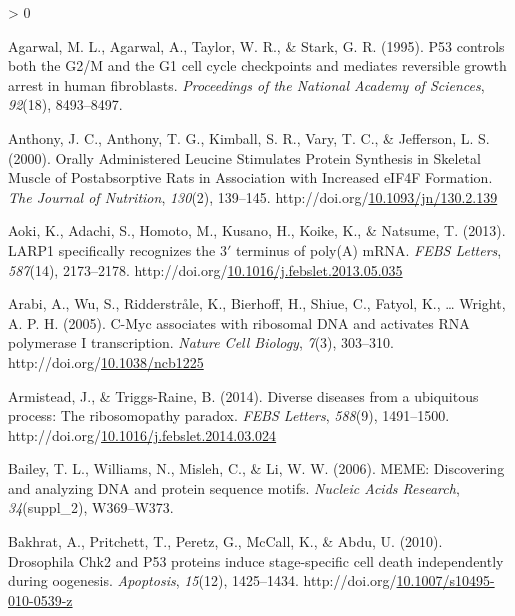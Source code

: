 \documentclass[12pt,oneside]{reedthesis}
\newlength{\cslhangindent}
\newenvironment{CSLReferences}[2] %
 {%
  \setlength{\parindent}{0pt}
  \ifodd #1 \everypar{\setlength{\hangindent}{\cslhangindent}}\ignorespaces\fi
  \ifnum #2 > 0
  \setlength{\parskip}{#2\baselineskip}
  \fi
 }%
 {}
\begin{document}
\hypertarget{refs}{}
\begin{CSLReferences}{1}{0}
\leavevmode\hypertarget{ref-Agarwal1995a}{}%
Agarwal, M. L., Agarwal, A., Taylor, W. R., \& Stark, G. R. (1995). P53 controls both the {G2}/{M} and the {G1} cell cycle checkpoints and mediates reversible growth arrest in human fibroblasts. \emph{Proceedings of the National Academy of Sciences}, \emph{92}(18), 8493--8497.

\leavevmode\hypertarget{ref-anthonyOrallyAdministeredLeucine2000}{}%
Anthony, J. C., Anthony, T. G., Kimball, S. R., Vary, T. C., \& Jefferson, L. S. (2000). Orally {Administered Leucine Stimulates Protein Synthesis} in {Skeletal Muscle} of {Postabsorptive Rats} in {Association} with {Increased eIF4F Formation}. \emph{The Journal of Nutrition}, \emph{130}(2), 139--145. http://doi.org/\href{https://doi.org/10.1093/jn/130.2.139}{10.1093/jn/130.2.139}

\leavevmode\hypertarget{ref-aokiLARP1SpecificallyRecognizes2013}{}%
Aoki, K., Adachi, S., Homoto, M., Kusano, H., Koike, K., \& Natsume, T. (2013). {LARP1} specifically recognizes the 3{\({'}\)} terminus of poly({A}) {mRNA}. \emph{FEBS Letters}, \emph{587}(14), 2173--2178. http://doi.org/\href{https://doi.org/10.1016/j.febslet.2013.05.035}{10.1016/j.febslet.2013.05.035}

\leavevmode\hypertarget{ref-arabiCMycAssociatesRibosomal2005}{}%
Arabi, A., Wu, S., Ridderstråle, K., Bierhoff, H., Shiue, C., Fatyol, K., \ldots{} Wright, A. P. H. (2005). C-{Myc} associates with ribosomal {DNA} and activates {RNA} polymerase {I} transcription. \emph{Nature Cell Biology}, \emph{7}(3), 303--310. http://doi.org/\href{https://doi.org/10.1038/ncb1225}{10.1038/ncb1225}

\leavevmode\hypertarget{ref-Armistead2014a}{}%
Armistead, J., \& Triggs-Raine, B. (2014). Diverse diseases from a ubiquitous process: {The} ribosomopathy paradox. \emph{FEBS Letters}, \emph{588}(9), 1491--1500. http://doi.org/\href{https://doi.org/10.1016/j.febslet.2014.03.024}{10.1016/j.febslet.2014.03.024}

\leavevmode\hypertarget{ref-Bailey2006a}{}%
Bailey, T. L., Williams, N., Misleh, C., \& Li, W. W. (2006). {MEME}: Discovering and analyzing {DNA} and protein sequence motifs. \emph{Nucleic Acids Research}, \emph{34}(suppl\_2), W369--W373.

\leavevmode\hypertarget{ref-bakhratDrosophilaChk2P532010}{}%
Bakhrat, A., Pritchett, T., Peretz, G., McCall, K., \& Abdu, U. (2010). Drosophila {Chk2} and P53 proteins induce stage-specific cell death independently during oogenesis. \emph{Apoptosis}, \emph{15}(12), 1425--1434. http://doi.org/\href{https://doi.org/10.1007/s10495-010-0539-z}{10.1007/s10495-010-0539-z}


\end{CSLReferences}
\end{document}
